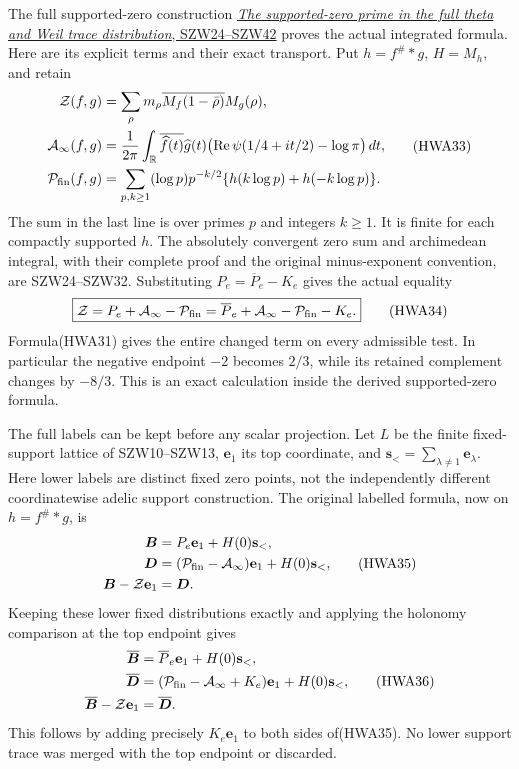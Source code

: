 \documentclass[
  10pt,
  a4paper,
]{article}
\begin{document}
The full supported-zero construction
\href{https://github.com/KokunoYumeto/zeta-function-research-reader/blob/adfbfe74fa49e31cb7aa068cf755fb083be37c32/workbenches/splitzero-tandem/branches/tau-zero-prime-positivity/SUPPORTED_ZERO_PRIME_WEIL_DERIVATION.md}{\emph{The
supported-zero prime in the full theta and Weil trace distribution},
SZW24--SZW42} proves the actual integrated formula. Here are its
explicit terms and their exact transport. Put \(h=f^\#*g\), \(H=M_h\),
and retain \[
\begin{aligned}
\mathcal Z(f,g)&=\sum_\rho m_\rho\overline{M_f(1-\bar\rho)}M_g(\rho),\\
\mathcal A_\infty(f,g)&=\frac1{2\pi}\int_{\mathbb R}
\overline{\widehat f(t)}\widehat g(t)
\bigl(\operatorname{Re}\psi(1/4+it/2)-\log\pi\bigr)\,dt,\\
\mathcal P_{\rm fin}(f,g)&=\sum_{p,k\ge1}(\log p)p^{-k/2}
\{h(k\log p)+h(-k\log p)\}.
\end{aligned}
\tag{HWA33}
\] The sum in the last line is over primes \(p\) and integers \(k\ge1\).
It is finite for each compactly supported \(h\). The absolutely
convergent zero sum and archimedean integral, with their complete proof
and the original minus-exponent convention, are SZW24--SZW32.
Substituting \(P_e=\overline P_e-K_e\) gives the actual equality \[
\boxed{\mathcal Z=P_e+\mathcal A_\infty-\mathcal P_{\rm fin}
=\overline P_e+\mathcal A_\infty-\mathcal P_{\rm fin}-K_e.}
\tag{HWA34}
\] Formula(HWA31) gives the entire changed term on every admissible
test. In particular the negative endpoint \(-2\) becomes \(2/3\), while
its retained complement changes by \(-8/3\). This is an exact
calculation inside the derived supported-zero formula.

The full labels can be kept before any scalar projection. Let \(L\) be
the finite fixed-support lattice of SZW10--SZW13, \(\mathbf e_1\) its
top coordinate, and
\(\mathbf s_< =\sum_{\lambda\ne1}\mathbf e_\lambda\). Here lower labels
are distinct fixed zero points, not the independently different
coordinatewise adelic support construction. The original labelled
formula, now on \(h=f^\#*g\), is \[
\begin{aligned}
\boldsymbol B&=P_e\mathbf e_1+H(0)\mathbf s_<,\\
\boldsymbol D&=(\mathcal P_{\rm fin}-\mathcal A_\infty)\mathbf e_1+H(0)\mathbf s_<,\\
\boldsymbol B-\mathcal Z\mathbf e_1&=\boldsymbol D.
\end{aligned}
\tag{HWA35}
\] Keeping these lower fixed distributions exactly and applying the
holonomy comparison at the top endpoint gives \[
\begin{aligned}
\overline{\boldsymbol B}&=\overline P_e\mathbf e_1+H(0)\mathbf s_<,\\
\overline{\boldsymbol D}&=(\mathcal P_{\rm fin}-\mathcal A_\infty+K_e)\mathbf e_1
 +H(0)\mathbf s_<,\\
\overline{\boldsymbol B}-\mathcal Z\mathbf e_1&=\overline{\boldsymbol D}.
\end{aligned}
\tag{HWA36}
\] This follows by adding precisely \(K_e\mathbf e_1\) to both sides
of(HWA35). No lower support trace was merged with the top endpoint or
discarded.
\end{document}
